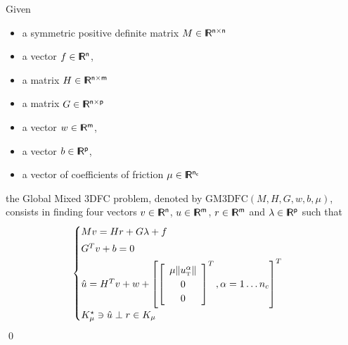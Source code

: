 \documentclass[twoside]{article}
\def\t{{\hbox{\tiny{T}}}}
\newcommand{\RR}{\ensuremath{\rm\sf I\!R}}
\begin{document}
\begin{definition}
  Given
  \begin{itemize}
    \item a symmetric positive definite matrix ${M} \in \RR^{n \times n}$
    \item a vector $ {f} \in \RR^n$,
    \item a matrix  ${H} \in \RR^{n \times m}$
    \item a matrix  ${G} \in \RR^{n \times p}$
     \item a vector $w \in \RR^{m}$,
     \item a vector $b \in \RR^{p}$,
    \item a vector of coefficients of friction $\mu \in \RR^{n_c}$
  \end{itemize}
 the Global Mixed 3DFC problem, denoted by $\mathrm{GM3DFC}(M,H,G,w,b,\mu)$, consists in finding four vectors $ {v} \in \RR^n$, $u\in\RR^m$, $r\in \RR^m$ and $\lambda \in \RR^p$ such that
\begin{equation}\label{eq:gmfc3d}
  \begin{cases}
    M v = {H} {r} + G\lambda + {f} \\[1mm]
    G^T v +b =0 \\[1mm]
    \hat u = H^T v + w +\left[
      \left[\begin{array}{c}
        \mu \|u^\alpha_\t\|\\
        0 \\
        0
      \end{array}\right]^T, \alpha = 1 \ldots n_c
\right]^T \\[1mm]
    K^\star_{\mu} \ni {\hat u} \perp r \in K_{\mu}
  \end{cases}
\end{equation}
\qed
\end{definition}
\end{document}
